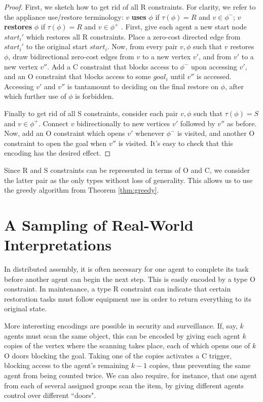 \documentclass[letterpaper]{article}
\begin{document}
\begin{proof}
First, we sketch how to get rid of all R constraints. For clarity, we refer to the appliance use/restore terminology: $v$ \textbf{uses} $\phi$ if $\tau(\phi) = R$ and $v\in\phi^-$; $v$ \textbf{restores} $\phi$ if $\tau(\phi) = R$ and $v\in\phi^+$ . First, give each agent a new start node $start_i'$ which restores all R constraints. Place a zero-cost directed edge from $start_i'$ to the original start $start_i$. Now, from every pair $v,\phi$ such that $v$ restores $\phi$, draw bidirectional zero-cost edges from $v$ to a new vertex $v'$, and from $v'$ to a new vertex $v''$. Add a C constraint that blocks access to $\phi^-$ upon accessing $v'$, and an O constraint that blocks access to some $goal_i$ until $v''$ is accessed. Accessing $v'$ and $v''$ is tantamount to deciding on the final restore on $\phi$, after which further use of $\phi$ is forbidden.

Finally to get rid of all S constraints, consider each pair $v,\phi$ such that $\tau(\phi) = S$ and $v\in\phi^+$. Connect $v$ bidirectionally to new vertices $v'$ followed by $v''$ as before. Now, add an O constraint which opens $v'$ whenever $\phi^-$ is visited, and another O constraint to open the goal when $v''$ is visited. It's easy to check that this encoding has the desired effect.
\end{proof}

Since R and S constraints can be represented in terms of O and C, we consider the latter pair as the only types without loss of generality. This allows us to use the greedy algorithm from Theorem \ref{thm:greedy}.

\section{A Sampling of Real-World Interpretations}

In distributed assembly, it is often necessary for one agent to complete its task before another agent can begin the next step. This is easily encoded by a type O constraint. In maintenance, a type R constraint can indicate that certain restoration tasks must follow equipment use in order to return everything to its original state.

More interesting encodings are possible in security and surveillance. If, say, $k$ agents must scan the same object, this can be encoded by giving each agent $k$ copies of the vertex where the scanning takes place, each of which opens one of $k$ O doors blocking the goal. Taking one of the copies activates a C trigger, blocking access to the agent's remaining $k-1$ copies, thus preventing the same agent from being counted twice. We can also require, for instance, that one agent from each of several assigned groups scan the item, by giving different agents control over different ``doors".
\end{document}
